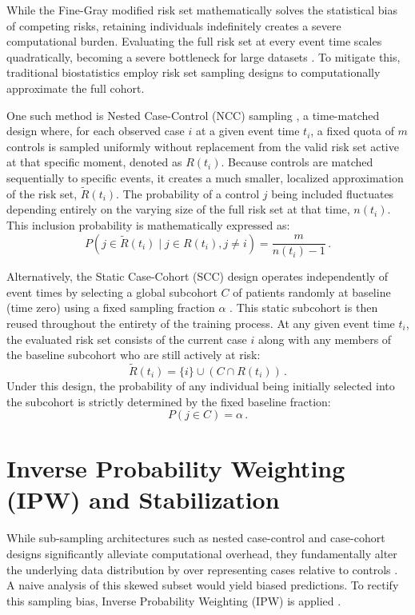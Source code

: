 \documentclass[a4paper,twoside,12pt]{report}
\begin{document}
While the Fine-Gray modified risk set mathematically solves the statistical bias of competing risks, retaining individuals indefinitely creates a severe computational burden. Evaluating the full risk set at every event time scales quadratically, becoming a severe bottleneck for large datasets \citep{Wang2020}. To mitigate this, traditional biostatistics employ risk set sampling designs to computationally approximate the full cohort. 

One such method is Nested Case-Control (NCC) sampling \cite{Borgan2000}, a time-matched design where, for each observed case $i$ at a given event time $t_i$, a fixed quota of $m$ controls is sampled uniformly without replacement from the valid risk set active at that specific moment, denoted as $R(t_i)$. Because controls are matched sequentially to specific events, it creates a much smaller, localized approximation of the risk set, $\tilde{R}(t_i)$. The probability of a control $j$ being included fluctuates depending entirely on the varying size of the full risk set at that time, $n(t_i)$. This inclusion probability is mathematically expressed as:
$$P(j \in \tilde{R}(t_i) \mid j \in R(t_i), j \neq i) = \frac{m}{n(t_i) - 1} \,.$$

Alternatively, the Static Case-Cohort (SCC) \cite{Prentice1986} design operates independently of event times by selecting a global subcohort $C$ of patients randomly at baseline (time zero) using a fixed sampling fraction $\alpha$ \citep{Prentice1986}. This static subcohort is then reused throughout the entirety of the training process. At any given event time $t_i$, the evaluated risk set consists of the current case $i$ along with any members of the baseline subcohort who are still actively at risk:
$$\tilde{R}(t_i) = \{i\} \cup (C \cap R(t_i)) \,.$$
Under this design, the probability of any individual being initially selected into the subcohort is strictly determined by the fixed baseline fraction:
$$P(j \in C) = \alpha \,.$$

\section{Inverse Probability Weighting (IPW) and Stabilization}

While sub-sampling architectures such as nested case-control and case-cohort designs significantly alleviate computational overhead, they fundamentally alter the underlying data distribution by over representing cases relative to controls \citep{Prentice1986, Borgan2000}. A naive analysis of this skewed subset would yield biased predictions. To rectify this sampling bias, Inverse Probability Weighting (IPW) is applied \citep{HorvitzThompson1952}. 
\end{document}
